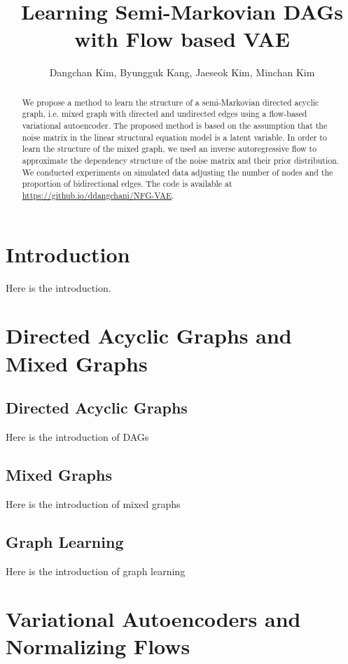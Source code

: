 \documentclass[10pt]{article}
\title{
\textbf{Learning Semi-Markovian DAGs with Flow based VAE}}
\author{Dangchan Kim, Byungguk Kang, Jaeseok Kim, Minchan Kim}
\begin{document}
\maketitle

\begin{abstract}
    We propose a method to learn the structure of a semi-Markovian directed acyclic graph, i.e. mixed graph with directed and undirected edges using a flow-based variational autoencoder. The proposed method is based on the assumption that the noise matrix in the linear structural equation model is a latent variable. In order to learn the structure of the mixed graph, we used an inverse autoregressive flow to approximate the dependency structure of the noise matrix and their prior distribution. We conducted experiments on simulated data adjusting the number of nodes and the proportion of bidirectional edges. The code is available at \url{https://github.io/ddangchani/NFG-VAE}.
\end{abstract}

\section{Introduction}

Here is the introduction.

\section{Directed Acyclic Graphs and Mixed Graphs}
\subsection{Directed Acyclic Graphs}

Here is the introduction of DAGs

\subsection{Mixed Graphs}

Here is the introduction of mixed graphs

\subsection{Graph Learning}

Here is the introduction of graph learning

\section{Variational Autoencoders and Normalizing Flows}
\end{document}
